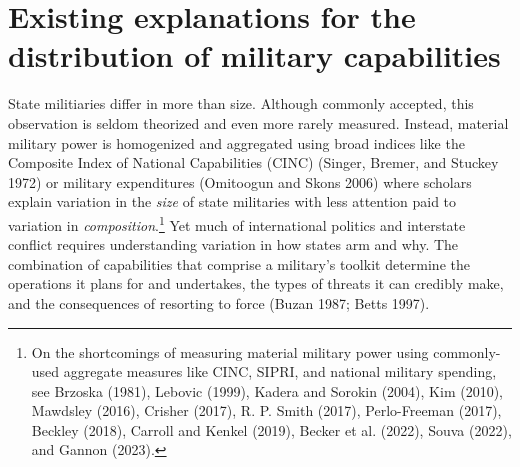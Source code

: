 \documentclass[
  12,
  letterpaper,
  DIV=11,
  numbers=noendperiod]{scrartcl}
\begin{document}
\hypertarget{sec-lit}{%
\section{Existing explanations for the distribution of military
capabilities}\label{sec-lit}}

State militiaries differ in more than size. Although commonly accepted,
this observation is seldom theorized and even more rarely measured.
Instead, material military power is homogenized and aggregated using
broad indices like the Composite Index of National Capabilities (CINC)
(Singer, Bremer, and Stuckey 1972) or military expenditures (Omitoogun
and Skons 2006) where scholars explain variation in the \emph{size} of
state militaries with less attention paid to variation in
\emph{composition}.\footnote{On the shortcomings of measuring material
  military power using commonly-used aggregate measures like CINC,
  SIPRI, and national military spending, see Brzoska (1981), Lebovic
  (1999), Kadera and Sorokin (2004), Kim (2010), Mawdsley (2016),
  Crisher (2017), R. P. Smith (2017), Perlo-Freeman (2017), Beckley
  (2018), Carroll and Kenkel (2019), Becker et al. (2022), Souva (2022),
  and Gannon (2023).} Yet much of international politics and interstate
conflict requires understanding variation in how states arm and why. The
combination of capabilities that comprise a military's toolkit determine
the operations it plans for and undertakes, the types of threats it can
credibly make, and the consequences of resorting to force (Buzan 1987;
Betts 1997).
\end{document}
